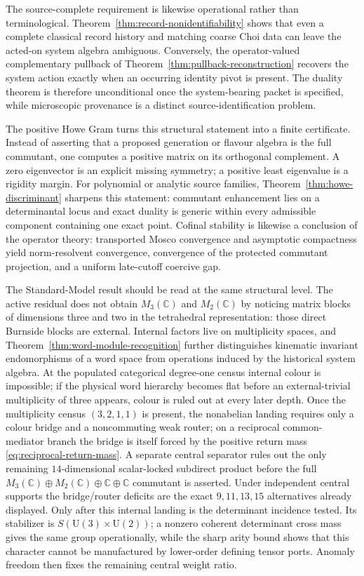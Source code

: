 \documentclass[11pt]{article}
\theoremstyle{definition}
\theoremstyle{remark}
\newcommand{\C}{\mathbb C}
\newcommand{\U}{\mathrm U}
\begin{document}
The source-complete requirement is likewise operational rather than
terminological.  Theorem~\ref{thm:record-nonidentifiability} shows that even a
complete classical record history and matching coarse Choi data can leave the
acted-on system algebra ambiguous.  Conversely, the operator-valued
complementary pullback of Theorem~\ref{thm:pullback-reconstruction} recovers
the system action exactly when an occurring identity pivot is present.  The
duality theorem is therefore unconditional once the system-bearing packet is
specified, while microscopic provenance is a distinct source-identification
problem.

The positive Howe Gram turns this structural statement into a finite
certificate.  Instead of asserting that a proposed generation or flavour
algebra is the full commutant, one computes a positive matrix on its
orthogonal complement.  A zero eigenvector is an explicit missing symmetry;
a positive least eigenvalue is a rigidity margin.  For polynomial or analytic
source families, Theorem~\ref{thm:howe-discriminant} sharpens this statement:
commutant enhancement lies on a determinantal locus and exact duality is
generic within every admissible component containing one exact point.  Cofinal
stability is likewise a conclusion of the operator theory: transported Mosco
convergence and asymptotic compactness yield norm-resolvent convergence,
convergence of the protected commutant projection, and a uniform late-cutoff
coercive gap.

The Standard-Model result should be read at the same structural level.  The
active residual does not obtain $M_3(\C)$ and $M_2(\C)$ by noticing matrix
blocks of dimensions three and two in the tetrahedral representation: those
direct Burnside blocks are external.  Internal factors live on multiplicity
spaces, and Theorem~\ref{thm:word-module-recognition} further distinguishes
kinematic invariant endomorphisms of a word space from operations induced by
the historical system algebra.  At the populated categorical degree-one
census internal colour is impossible; if the physical word hierarchy becomes
flat before an external-trivial multiplicity of three appears, colour is ruled
out at every later depth.  Once the multiplicity census $(3,2,1,1)$ is present,
the nonabelian landing requires only a colour bridge and a noncommuting weak
router; on a reciprocal common-mediator branch the bridge is itself forced by
the positive return mass \eqref{eq:reciprocal-return-mass}.  A separate central
separator rules out the only remaining $14$-dimensional scalar-locked
subdirect product before the full
$M_3(\C)\oplus M_2(\C)\oplus\C\oplus\C$ commutant is asserted.  Under
independent central supports the bridge/router deficits are the exact
$9,11,13,15$ alternatives already displayed.  Only after this internal
landing is the determinant incidence tested.  Its stabilizer is
$S(\U(3)\times\U(2))$; a nonzero coherent determinant cross mass gives the same
group operationally, while the sharp arity bound shows that this character
cannot be manufactured by lower-order defining tensor ports.  Anomaly freedom
then fixes the remaining central weight ratio.
\end{document}
